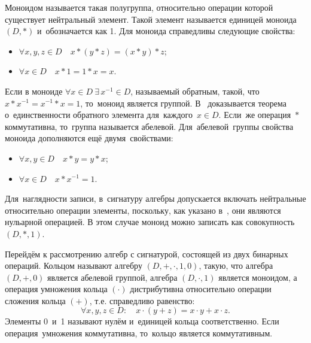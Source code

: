 Моноидом называется такая полугруппа, относительно операции которой существует нейтральный элемент. Такой элемент называется единицей моноида $\left( D,* \right)$ и~обозначается как 1. Для моноида справедливы следующие свойства:
\begin{itemize}
	\item $\forall x,y,z\in D\quad x*\left( y*z \right)=\left( x*y \right)*z$;
	\item $\forall x\in D\quad x*1=1*x=x$.
\end{itemize}

Если в моноиде $\forall x\in D\ \exists \,{{x}^{-1}}\in D$, называемый обратным, такой, что~$x*{{x}^{-1}}={{x}^{-1}}*x=1$, то~моноид является группой. В~\cite{Bauman_DM, Adelson_Velskiy, Voevodin} доказывается теорема о~единственности обратного элемента для~каждого~$x\in D$. Если~же операция~$*$ коммутативна, то~группа называется абелевой. Для~абелевой~группы свойства моноида дополняются ещё двумя~свойствами:
\begin{itemize}
	\item $\forall x,y\in D\quad x*y=y*x$;
	\item $\forall x\in D\quad x*{{x}^{-1}}=1$.
\end{itemize}

Для~наглядности записи, в~сигнатуру алгебры допускается включать нейтральные относительно операции элементы, поскольку, как указано в~\cite{Bauman_DM}, они являются нульарной операцией. В этом случае моноид можно записать как совокупность $\left( D,*,1 \right)$.

Перейдём к рассмотрению алгебр с сигнатурой, состоящей из двух бинарных операций. Кольцом называют алгебру $\left( D,+,\cdot ,1,0 \right)$, такую, что алгебра $\left( D,+,0 \right)$ является абелевой группой, алгебра $\left( D,\cdot ,1 \right)$ является моноидом, а операция умножения кольца $\left( \cdot  \right)$ дистрибутивна относительно операции сложения кольца $\left( + \right)$, т.е. справедливо равенство:
\begin{equation*}
	\forall x,y,z\in D:\quad x\cdot \left( y+z \right)=x\cdot y+x\cdot z.
\end{equation*}
Элементы 0~и~1 называют нулём и~единицей кольца соответственно. Если операция~умножения коммутативна, то~кольцо является коммутативным.

